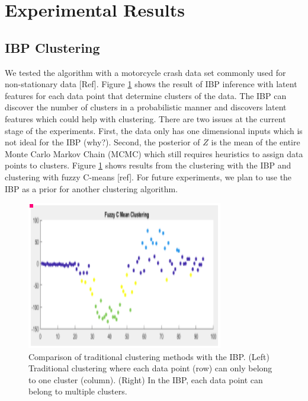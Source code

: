 \documentclass{article}
\begin{document}
\section{Experimental Results}

\subsection{IBP Clustering}

We tested the algorithm with a motorcycle crash data set commonly used for non-stationary data [Ref]. Figure \ref{IBPClust} shows the result of IBP inference with latent features for each data point that determine clusters of the data. The IBP can discover the number of clusters in a probabilistic manner and discovers latent features which could help with clustering. There are two issues at the current stage of the experiments. First, the data only has one dimensional inputs which is not ideal for the IBP (why?). Second, the posterior of $Z$ is the mean of the entire Monte Carlo Markov Chain (MCMC) which still requires heuristics to assign data points to clusters. Figure \ref{IBPClust} shows results from the clustering with the IBP and clustering with fuzzy C-means [ref]. For future experiments, we plan to use the IBP as a prior for another clustering algorithm.

\begin{figure}[ht]
\vskip 0.2in
\begin{center}
\centerline{\includegraphics[width=\columnwidth]{IBPClust}}
\caption{Comparison of traditional clustering methods with the IBP. (Left) Traditional clustering where each data point (row) can only belong to one cluster (column). (Right) In the IBP, each data point can belong to multiple clusters.}
\label{IBPClust}
\end{center}
\vskip -0.2in
\end{figure} 
\end{document}
